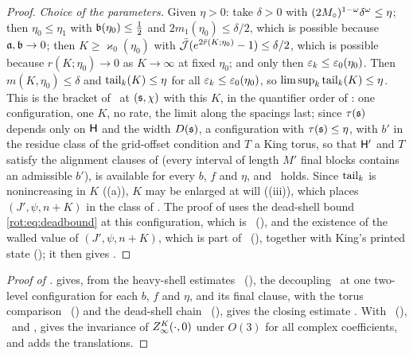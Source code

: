 \begin{proof}
\emph{Choice of the parameters.} Given $\eta>0$: take $\delta>0$ with $(2M_\circ)^{1-\omega}\delta^{\omega}\le\eta$; then $\eta_0\le\eta_1$ with $\mathfrak b(\eta_0)\le\frac12$ and $2m_1(\eta_0)\le\delta/2$, which is possible because $\mathfrak a,\mathfrak b\to0$; then $K\ge\varkappa_0(\eta_0)$ with $\bar{\mathcal J}(e^{2\bar r(K;\eta_0)}-1)\le\delta/2$, which is possible because $r(K;\eta_0)\to0$ as $K\to\infty$ at fixed $\eta_0$; and only then $\varepsilon_k\le\varepsilon_0(\eta_0)$. Then $m(K,\eta_0)\le\delta$ and $\operatorname{tail}_k(K)\le\eta$ for all $\varepsilon_k\le\varepsilon_0(\eta_0)$, so $\limsup_k\operatorname{tail}_k(K)\le\eta$. This is the bracket of \REz\ at $(\mathfrak s,\chi)$ with this $K$, in the quantifier order of : one configuration, one $K$, no rate, the limit along the spacings last; since $\tau(\mathfrak s)$ depends only on $\mathsf H$ and the width $D(\mathfrak s)$, a configuration with $\tau(\mathfrak s)\le\eta$, with $b'$ in the residue class of the grid-offset condition and $T$ a King torus, so that $\mathsf H'$ and $T$ satisfy the alignment clauses of  (every interval of length $M'$ final blocks contains an admissible $b'$), is available for every $b$, $f$ and $\eta$, and \REz\ holds. Since $\operatorname{tail}_k$ is nonincreasing in $K$ ((a)), $K$ may be enlarged at will ((iii)), which places $(J',\psi,n+K)$ in the class of . The proof of  uses the dead-shell bound \eqref{rot:eq:deadbound} at this configuration, which is \DSh\ (), and the existence of the walled value of $(J',\psi,n+K)$, which is part of \Kz\ (), together with King's printed state (\EC); it then gives \TIz.
\end{proof}

\begin{proof}[Proof of ]
 gives, from the heavy-shell estimates \HS\ (), the decoupling \REz\ at one two-level configuration for each $b$, $f$ and $\eta$, and its final clause,  with the torus comparison \Kz\ () and the dead-shell chain \DSh\ (), gives the closing estimate \TIz. With \EC\ (), \Kz\ and \TIz,  gives the invariance of $Z^{K}_{\infty}(\cdot,0)$ under $O(3)$ for all complex coefficients, and  adds the translations.
\end{proof}

